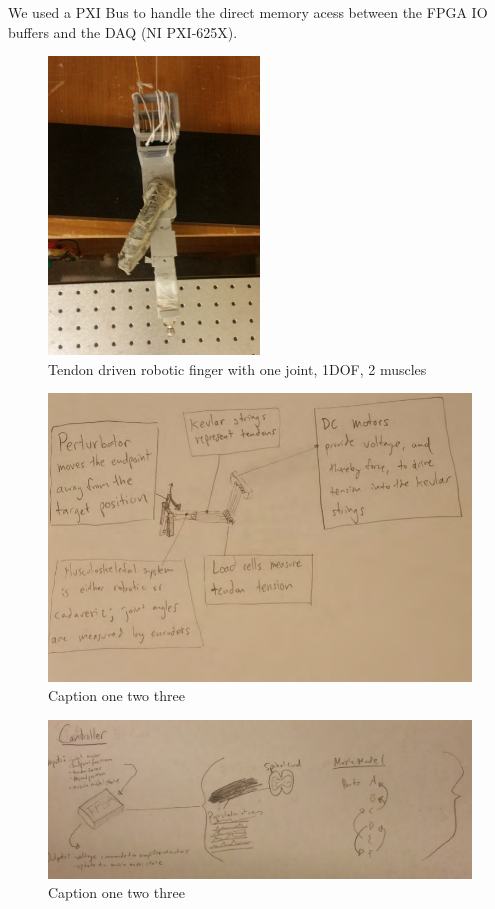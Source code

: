 We used a PXI Bus to handle the direct memory acess between the FPGA IO buffers and the DAQ (NI PXI-625X).


\begin{figure}[schematic_finger_overhead]
  \label{fig:schematic_finger_overhead}
  \centering
  \includegraphics[width=0.5\textwidth]{figures/overhead_robotic_finger.pdf}
  \caption{Tendon driven robotic finger with one joint, 1DOF, 2 muscles}
\end{figure}

\begin{figure}[hardware_schematic]
  \label{fig:hardware_schematic}
  \centering
  \includegraphics[width=1.0\textwidth]{figures/hardware_schematic.pdf}
  \caption{Caption one two three}
\end{figure}

\begin{figure}[fpga_schematic]
  \label{fig:fpga_schematic}
  \centering
  \includegraphics[width=1.0\textwidth]{figures/fpga_schematic.pdf}
  \caption{Caption one two three}
\end{figure}


